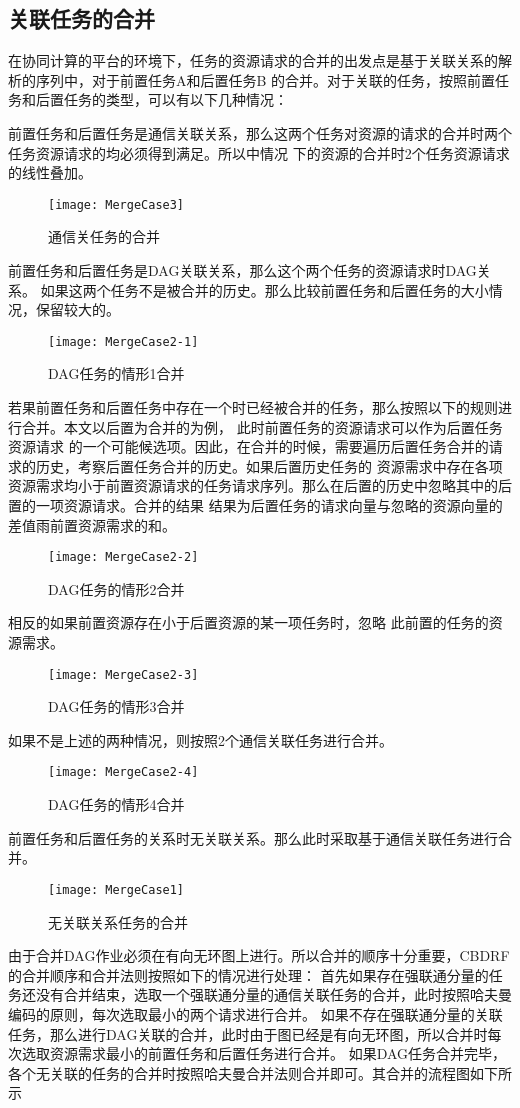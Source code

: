 \subsection{关联任务的合并}
在协同计算的平台的环境下，任务的资源请求的合并的出发点是基于关联关系的解析的序列中，对于前置任务A和后置任务B
的合并。对于关联的任务，按照前置任务和后置任务的类型，可以有以下几种情况：

前置任务和后置任务是通信关联关系，那么这两个任务对资源的请求的合并时两个任务资源请求的均必须得到满足。所以中情况
下的资源的合并时2个任务资源请求的线性叠加。
\begin{figure}[htbp]
\centering\texttt{[image: MergeCase3]}
\caption{通信关任务的合并}\label{fig:MergeCase3}
\end{figure}

前置任务和后置任务是DAG关联关系，那么这个两个任务的资源请求时DAG关系。
如果这两个任务不是被合并的历史。那么比较前置任务和后置任务的大小情况，保留较大的。
\begin{figure}[htbp]
\centering\texttt{[image: MergeCase2-1]}
\caption{DAG任务的情形1合并}\label{fig:MergeCase2-1}
\end{figure}
若果前置任务和后置任务中存在一个时已经被合并的任务，那么按照以下的规则进行合并。本文以后置为合并的为例，
此时前置任务的资源请求可以作为后置任务资源请求
的一个可能候选项。因此，在合并的时候，需要遍历后置任务合并的请求的历史，考察后置任务合并的历史。如果后置历史任务的
资源需求中存在各项资源需求均小于前置资源请求的任务请求序列。那么在后置的历史中忽略其中的后置的一项资源请求。合并的结果
结果为后置任务的请求向量与忽略的资源向量的差值雨前置资源需求的和。
\begin{figure}[htbp]
\centering\texttt{[image: MergeCase2-2]}
\caption{DAG任务的情形2合并}\label{fig:MergeCase2-2}
\end{figure}
相反的如果前置资源存在小于后置资源的某一项任务时，忽略
此前置的任务的资源需求。
\begin{figure}[htbp]
\centering\texttt{[image: MergeCase2-3]}
\caption{DAG任务的情形3合并}\label{fig:MergeCase2-3}
\end{figure}
如果不是上述的两种情况，则按照2个通信关联任务进行合并。
\begin{figure}[htbp]
\centering\texttt{[image: MergeCase2-4]}
\caption{DAG任务的情形4合并}\label{fig:MergeCase2-4}
\end{figure}

前置任务和后置任务的关系时无关联关系。那么此时采取基于通信关联任务进行合并。
\begin{figure}[htbp]
\centering\texttt{[image: MergeCase1]}
\caption{无关联关系任务的合并}\label{fig:MergeCase1}
\end{figure}
由于合并DAG作业必须在有向无环图上进行。所以合并的顺序十分重要，CBDRF的合并顺序和合并法则按照如下的情况进行处理：
首先如果存在强联通分量的任务还没有合并结束，选取一个强联通分量的通信关联任务的合并，此时按照哈夫曼编码的原则，每次选取最小的两个请求进行合并。
如果不存在强联通分量的关联任务，那么进行DAG关联的合并，此时由于图已经是有向无环图，所以合并时每次选取资源需求最小的前置任务和后置任务进行合并。
如果DAG任务合并完毕，各个无关联的任务的合并时按照哈夫曼合并法则合并即可。其合并的流程图如下所示

